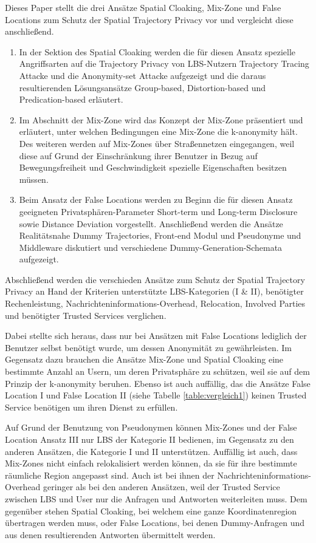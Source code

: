 Dieses Paper stellt die drei Ansätze Spatial Cloaking, Mix-Zone und False Locations zum Schutz der Spatial Trajectory Privacy vor und vergleicht diese anschließend.
\begin{enumerate}
	\item In der Sektion des Spatial Cloaking werden die für diesen Ansatz spezielle Angriffsarten auf die Trajectory Privacy von LBS-Nutzern Trajectory Tracing Attacke und die Anonymity-set Attacke aufgezeigt und die daraus resultierenden Lösungsansätze Group-based, Distortion-based und Predication-based erläutert.
	\item Im Abschnitt der Mix-Zone wird das Konzept der Mix-Zone präsentiert und erläutert, unter welchen Bedingungen eine Mix-Zone die k-anonymity hält. Des weiteren werden auf Mix-Zones über Straßennetzen eingegangen, weil diese auf Grund der Einschränkung ihrer Benutzer in Bezug auf Bewegungsfreiheit und Geschwindigkeit spezielle Eigenschaften besitzen müssen.
	\item Beim Ansatz der False Locations werden zu Beginn die für diesen Ansatz geeigneten Privatsphären-Parameter Short-term und Long-term Disclosure sowie Distance Deviation vorgestellt. Anschließend werden die Ansätze Realitätsnahe Dummy Trajectories, Front-end Modul und Pseudonyme und Middleware diskutiert und verschiedene Dummy-Generation-Schemata aufgezeigt.
\end{enumerate}
Abschließend werden die verschieden Ansätze zum Schutz der Spatial Trajectory Privacy an Hand der Kriterien unterstützte LBS-Kategorien (I \& II), benötigter Rechenleistung, Nachrichteninformations-Overhead, Relocation, Involved Parties und benötigter Trusted Services verglichen. 

Dabei stellte sich heraus, dass nur bei Ansätzen mit False Locations lediglich der Benutzer selbst benötigt wurde, um dessen Anonymität zu gewährleisten. Im Gegensatz dazu brauchen die Ansätze Mix-Zone und Spatial Cloaking eine bestimmte Anzahl an Usern, um deren Privatsphäre zu schützen, weil sie auf dem Prinzip der k-anonymity beruhen. Ebenso ist auch auffällig, das die Ansätze False Location I und False Location II (siehe Tabelle \ref{table:vergleich1}) keinen Trusted Service benötigen um ihren Dienst zu erfüllen. 

Auf Grund der Benutzung von Pseudonymen können Mix-Zones und der False Location Ansatz III nur LBS der Kategorie II bedienen, im Gegensatz zu den anderen Ansätzen, die Kategorie I und II unterstützen. Auffällig ist auch, dass Mix-Zones nicht einfach relokalisiert werden können, da sie für ihre bestimmte räumliche Region angepasst sind. Auch ist bei ihnen der Nachrichteninformations-Overhead geringer als bei den anderen Ansätzen, weil der Trusted Service zwischen LBS und User nur die Anfragen und Antworten weiterleiten muss. Dem gegenüber stehen Spatial Cloaking, bei welchem eine ganze Koordinatenregion übertragen werden muss, oder False Locations, bei denen Dummy-Anfragen und aus denen resultierenden Antworten übermittelt werden.    